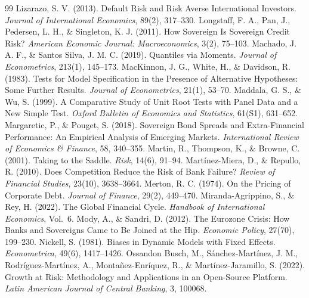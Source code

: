 \begin{thebibliography}{99}
 Lizarazo, S. V. (2013). Default Risk and Risk Averse International Investors. \textit{Journal of International Economics}, 89(2), 317--330.
 Longstaff, F. A., Pan, J., Pedersen, L. H., \& Singleton, K. J. (2011). How Sovereign Is Sovereign Credit Risk? \textit{American Economic Journal: Macroeconomics}, 3(2), 75--103.
 Machado, J. A. F., \& Santos Silva, J. M. C. (2019). Quantiles via Moments. \textit{Journal of Econometrics}, 213(1), 145--173.
 MacKinnon, J. G., White, H., \& Davidson, R. (1983). Tests for Model Specification in the Presence of Alternative Hypotheses: Some Further Results. \textit{Journal of Econometrics}, 21(1), 53--70.
 Maddala, G. S., \& Wu, S. (1999). A Comparative Study of Unit Root Tests with Panel Data and a New Simple Test. \textit{Oxford Bulletin of Economics and Statistics}, 61(S1), 631--652.
 Margaretic, P., \& Pouget, S. (2018). Sovereign Bond Spreads and Extra-Financial Performance: An Empirical Analysis of Emerging Markets. \textit{International Review of Economics \& Finance}, 58, 340--355.
 Martin, R., Thompson, K., \& Browne, C. (2001). Taking to the Saddle. \textit{Risk}, 14(6), 91--94.
 Martínez-Miera, D., \& Repullo, R. (2010). Does Competition Reduce the Risk of Bank Failure? \textit{Review of Financial Studies}, 23(10), 3638--3664.
 Merton, R. C. (1974). On the Pricing of Corporate Debt. \textit{Journal of Finance}, 29(2), 449--470.
 Miranda-Agrippino, S., \& Rey, H. (2022). The Global Financial Cycle. \textit{Handbook of International Economics}, Vol.\ 6.
 Mody, A., \& Sandri, D. (2012). The Eurozone Crisis: How Banks and Sovereigns Came to Be Joined at the Hip. \textit{Economic Policy}, 27(70), 199--230.
 Nickell, S. (1981). Biases in Dynamic Models with Fixed Effects. \textit{Econometrica}, 49(6), 1417--1426.
 Ossandon Busch, M., Sánchez-Martínez, J. M., Rodríguez-Martínez, A., Montañez-Enríquez, R., \& Martínez-Jaramillo, S. (2022). Growth at Risk: Methodology and Applications in an Open-Source Platform. \textit{Latin American Journal of Central Banking}, 3, 100068.

\end{thebibliography}
